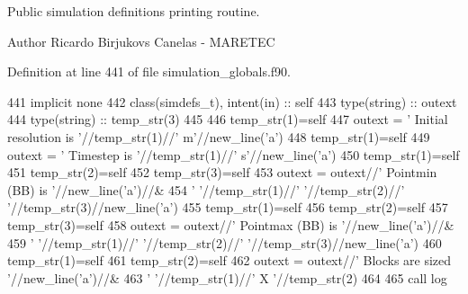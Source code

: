 Public simulation definitions printing routine. 

\begin{DoxyAuthor}{Author}
Ricardo Birjukovs Canelas -\/ M\+A\+R\+E\+T\+EC 
\end{DoxyAuthor}


Definition at line 441 of file simulation\+\_\+globals.\+f90.


\begin{DoxyCode}
441     \textcolor{keywordtype}{implicit none}
442     \textcolor{keywordtype}{class}(simdefs\_t), \textcolor{keywordtype}{intent(in)} :: self
443     \textcolor{keywordtype}{type}(string) :: outext
444     \textcolor{keywordtype}{type}(string) :: temp\_str(3)
445 
446     temp\_str(1)=self%
447     outext = \textcolor{stringliteral}{'      Initial resolution is '}//temp\_str(1)//\textcolor{stringliteral}{' m'}//new\_line(\textcolor{stringliteral}{'a'})
448     temp\_str(1)=self%
449     outext = \textcolor{stringliteral}{'      Timestep is '}//temp\_str(1)//\textcolor{stringliteral}{' s'}//new\_line(\textcolor{stringliteral}{'a'})
450     temp\_str(1)=self%
451     temp\_str(2)=self%
452     temp\_str(3)=self%
453     outext = outext//\textcolor{stringliteral}{'       Pointmin (BB) is '}//new\_line(\textcolor{stringliteral}{'a'})//&
454         \textcolor{stringliteral}{'       '}//temp\_str(1)//\textcolor{stringliteral}{' '}//temp\_str(2)//\textcolor{stringliteral}{' '}//temp\_str(3)//new\_line(\textcolor{stringliteral}{'a'})
455     temp\_str(1)=self%
456     temp\_str(2)=self%
457     temp\_str(3)=self%
458     outext = outext//\textcolor{stringliteral}{'       Pointmax (BB) is '}//new\_line(\textcolor{stringliteral}{'a'})//&
459         \textcolor{stringliteral}{'       '}//temp\_str(1)//\textcolor{stringliteral}{' '}//temp\_str(2)//\textcolor{stringliteral}{' '}//temp\_str(3)//new\_line(\textcolor{stringliteral}{'a'})
460     temp\_str(1)=self%
461     temp\_str(2)=self%
462     outext = outext//\textcolor{stringliteral}{'       Blocks are sized '}//new\_line(\textcolor{stringliteral}{'a'})//&
463         \textcolor{stringliteral}{'       '}//temp\_str(1)//\textcolor{stringliteral}{' X '}//temp\_str(2)
464 
465     \textcolor{keyword}{call }log%
\end{DoxyCode}
\mbox{\label{namespacesimulation__globals__mod_a97c04d0289a9f2d004a9329cb7ab16f0}} 

